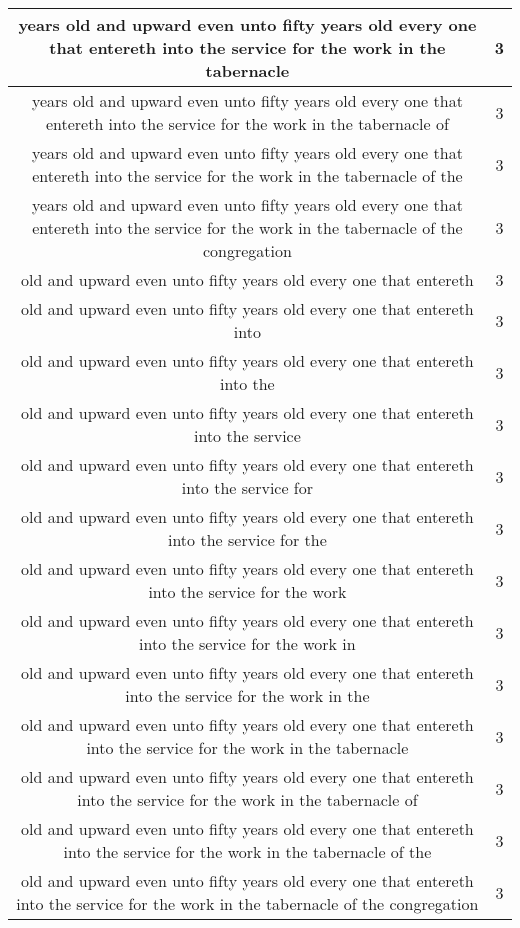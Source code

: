 \begin{center}
\begin{longtable}{|c|c|}
years old and upward even unto fifty years old every one that entereth into the service for the work in the tabernacle & 3\\ \hline 
years old and upward even unto fifty years old every one that entereth into the service for the work in the tabernacle of & 3\\ \hline 
years old and upward even unto fifty years old every one that entereth into the service for the work in the tabernacle of the & 3\\ \hline 
years old and upward even unto fifty years old every one that entereth into the service for the work in the tabernacle of the congregation & 3\\ \hline 
old and upward even unto fifty years old every one that entereth & 3\\ \hline 
old and upward even unto fifty years old every one that entereth into & 3\\ \hline 
old and upward even unto fifty years old every one that entereth into the & 3\\ \hline 
old and upward even unto fifty years old every one that entereth into the service & 3\\ \hline 
old and upward even unto fifty years old every one that entereth into the service for & 3\\ \hline 
old and upward even unto fifty years old every one that entereth into the service for the & 3\\ \hline 
old and upward even unto fifty years old every one that entereth into the service for the work & 3\\ \hline 
old and upward even unto fifty years old every one that entereth into the service for the work in & 3\\ \hline 
old and upward even unto fifty years old every one that entereth into the service for the work in the & 3\\ \hline 
old and upward even unto fifty years old every one that entereth into the service for the work in the tabernacle & 3\\ \hline 
old and upward even unto fifty years old every one that entereth into the service for the work in the tabernacle of & 3\\ \hline 
old and upward even unto fifty years old every one that entereth into the service for the work in the tabernacle of the & 3\\ \hline 
old and upward even unto fifty years old every one that entereth into the service for the work in the tabernacle of the congregation & 3\\ \hline 

\end{longtable}
\end{center}
